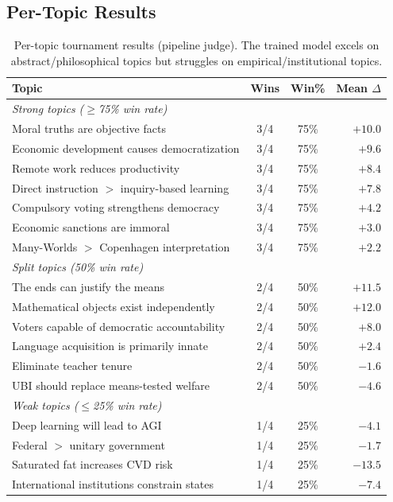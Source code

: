 \subsection{Per-Topic Results}

\begin{table}[h]
\centering
\small
\begin{tabular}{p{6cm}ccr}
\toprule
\textbf{Topic} & \textbf{Wins} & \textbf{Win\%} & \textbf{Mean $\Delta$} \\
\midrule
\multicolumn{4}{l}{\textit{Strong topics ($\geq$75\% win rate)}} \\
Moral truths are objective facts & 3/4 & 75\% & $+10.0$ \\
Economic development causes democratization & 3/4 & 75\% & $+9.6$ \\
Remote work reduces productivity & 3/4 & 75\% & $+8.4$ \\
Direct instruction $>$ inquiry-based learning & 3/4 & 75\% & $+7.8$ \\
Compulsory voting strengthens democracy & 3/4 & 75\% & $+4.2$ \\
Economic sanctions are immoral & 3/4 & 75\% & $+3.0$ \\
Many-Worlds $>$ Copenhagen interpretation & 3/4 & 75\% & $+2.2$ \\
\midrule
\multicolumn{4}{l}{\textit{Split topics (50\% win rate)}} \\
The ends can justify the means & 2/4 & 50\% & $+11.5$ \\
Mathematical objects exist independently & 2/4 & 50\% & $+12.0$ \\
Voters capable of democratic accountability & 2/4 & 50\% & $+8.0$ \\
Language acquisition is primarily innate & 2/4 & 50\% & $+2.4$ \\
Eliminate teacher tenure & 2/4 & 50\% & $-1.6$ \\
UBI should replace means-tested welfare & 2/4 & 50\% & $-4.6$ \\
\midrule
\multicolumn{4}{l}{\textit{Weak topics ($\leq$25\% win rate)}} \\
Deep learning will lead to AGI & 1/4 & 25\% & $-4.1$ \\
Federal $>$ unitary government & 1/4 & 25\% & $-1.7$ \\
Saturated fat increases CVD risk & 1/4 & 25\% & $-13.5$ \\
International institutions constrain states & 1/4 & 25\% & $-7.4$ \\
\bottomrule
\end{tabular}
\caption{Per-topic tournament results (pipeline judge). The trained model excels on
abstract/philosophical topics but struggles on empirical/institutional topics.}
\end{table}

